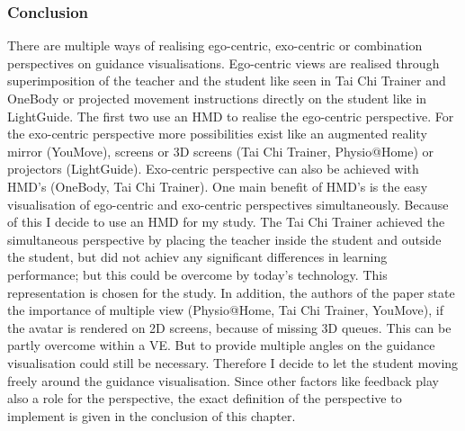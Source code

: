 \subsubsection{Conclusion}
There are multiple ways of realising ego-centric, exo-centric or combination perspectives on guidance visualisations. Ego-centric views are realised through superimposition of the teacher and the student like seen in Tai Chi Trainer and OneBody or projected movement instructions directly on the student like in LightGuide. The first two use an HMD to realise the ego-centric perspective. For the exo-centric perspective more possibilities exist like an augmented reality mirror (YouMove), screens or 3D screens (Tai Chi Trainer, Physio@Home) or projectors (LightGuide). Exo-centric perspective can also be achieved with HMD's (OneBody, Tai Chi Trainer). One main benefit of HMD's is the easy visualisation of ego-centric and exo-centric perspectives simultaneously. Because of this I decide to use an HMD for my study. The Tai Chi Trainer achieved the simultaneous perspective by placing the teacher inside the student and outside the student, but did not achiev any significant differences in learning performance; but this could be overcome by today's technology. This representation is chosen for the study. In addition, the authors of the paper state the importance of multiple view (Physio@Home, Tai Chi Trainer, YouMove), if the avatar is rendered on 2D screens, because of missing 3D queues. This can be partly overcome within a VE. But to provide multiple angles on the guidance visualisation could still be necessary. Therefore I decide to let the student moving freely around the guidance visualisation. Since other factors like feedback play also a role for the perspective, the exact definition of the perspective to implement is given in the conclusion of this chapter.

